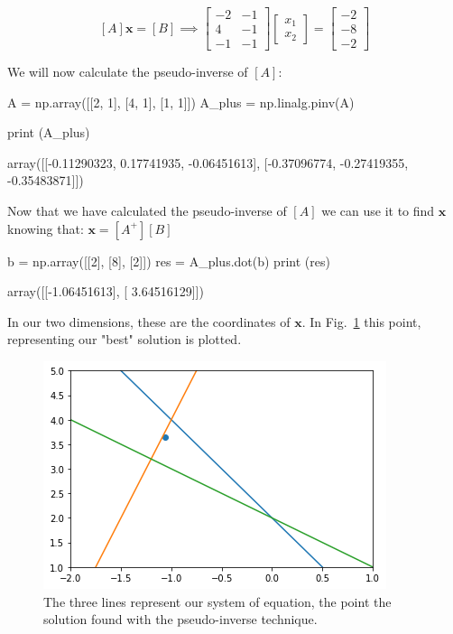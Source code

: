 \[[A]\mathbf{x}=[B]\implies 
\begin{bmatrix}
−2&-1\\
4&-1\\
−1&−1\end{bmatrix}
\begin{bmatrix}
x_1\\
x_2\end{bmatrix}=
\begin{bmatrix}
−2\\
−8\\
−2\end{bmatrix}\]

We will now calculate the pseudo-inverse of \([A]\):

\begin{ipython}
A = np.array([[2, 1], [4, 1], [1, 1]])
A_plus = np.linalg.pinv(A)

print (A_plus)
\end{ipython}
\begin{ioutput}
array([[-0.11290323,  0.17741935, -0.06451613],
       [-0.37096774, -0.27419355, -0.35483871]])
\end{ioutput}

Now that we have calculated the pseudo-inverse of \([A]\) we can use it to find \(\mathbf{x}\) knowing that: \(\mathbf{x}=[A^+] [B]\)

\begin{ipython}
b = np.array([[2], [8], [2]])
res = A_plus.dot(b)
print (res)
\end{ipython}
\begin{ioutput}
array([[-1.06451613],
       [ 3.64516129]])
\end{ioutput}

In our two dimensions, these are the coordinates of \(\mathbf{x}\). In Fig.~\ref{fig:overdet_system} this point, representing our "best" solution is plotted.

\begin{figure}[htb]
	\centering
	\includegraphics[width=0.7\linewidth]{figures/overdet_system}
	\caption{The three lines represent our system of equation, the point 
		the solution found with the pseudo-inverse technique.}
	\label{fig:overdet_system}
\end{figure}

